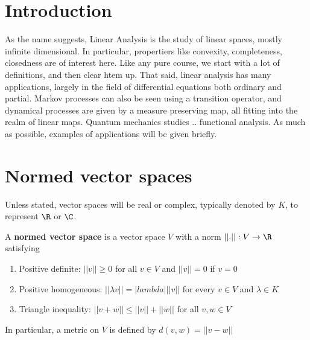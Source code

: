 \documentclass{article}
\begin{document}
\maketitle

\section{Introduction}
As the name suggests, Linear Analysis is the study of linear spaces, mostly infinite dimensional. In particular, propertiers like convexity, completeness, closedness are of interest here.  Like any pure course, we start with a lot of definitions, and then clear htem up.  That said, linear analysis has many applications, largely in the field of differential equations both ordinary and partial.  Markov processes can also be seen using a transition operator, and dynamical processes are given by a measure preserving map, all fitting into the realm of linear maps.  Quantum mechanics studies .. functional analysis.  As much as possible, examples of applications will be given briefly.
\section{Normed vector spaces}
Unless stated, vector spaces will be real or complex, typically denoted by $K$, to represent $\R$ or $\C$.

\begin{defi}
    A \textbf{normed vector space} is a vector space $V$ with a norm $||.|| : V \to \R$ satisfying
    \begin{enumerate} %
        \item Positive definite: $||v|| \geq 0$ for all $v \in V$ and $||v|| = 0$ if $v= 0 $
        \item Positive homogeneous: $||\lambda v|| = |lambda| ||v||$ for every $v \in V$ and $\lambda \in K$
        \item Triangle inequality: $||v + w|| \leq ||v|| + ||w||$ for all $v, w \in V$
    \end{enumerate}
\end{defi}
In particular, a metric on $V$ is defined by $d(v, w) = ||v - w||$
\end{document}
